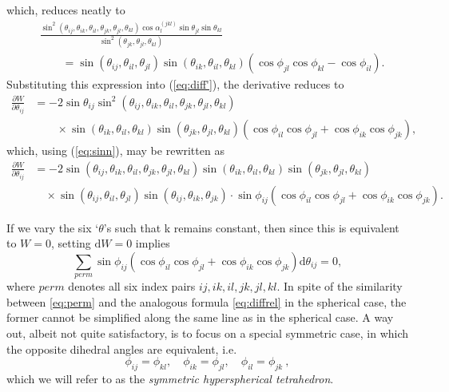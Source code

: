 \documentclass[fleqn,11pt,twoside]{article}
\theoremstyle{definition}
\begin{document}
which, reduces neatly to
\begin{align}
& \frac{\sin^2(\theta_{ij},\theta_{ik},\theta_{il},\theta_{jk},\theta_{jl},\theta_{kl})\cos\alpha_l^{(jkl)}\sin\theta_{jl}\sin\theta_{kl}}{\sin^2(\theta_{jk},\theta_{jl},\theta_{kl})} 
\nonumber \\ 
& \qquad =
\sin(\theta_{ij},\theta_{il},\theta_{jl})\sin(\theta_{ik},\theta_{il},\theta_{kl})\left(\cos\phi_{jl}\cos\phi_{kl}-
\cos\phi_{il}\right).
\end{align}
Substituting this expression into (\ref{eq:diff'}), the derivative reduces to 
\begin{align}
\frac{\partial W}{\partial\theta_{ij}}& =-2\sin\theta_{ij}\sin^2(\theta_{ij},\theta_{ik},\theta_{il},\theta_{jk},\theta_{jl},\theta_{kl}) \nonumber \\ 
& \qquad \times \sin(\theta_{ik},\theta_{il},\theta_{kl})\sin(\theta_{jk},\theta_{jl},\theta_{kl})\left(\cos\phi_{il}\cos\phi_{jl}+\cos\phi_{ik}\cos\phi_{jk}\right),
\end{align}
which, using (\ref{eq:sinn}), may be rewritten as
\begin{equation}
\begin{split}
\frac{\partial W}{\partial\theta_{ij}}& =-2\sin(\theta_{ij},\theta_{ik},\theta_{il},\theta_{jk},\theta_{jl},\theta_{kl})
\sin(\theta_{ik},\theta_{il},\theta_{kl})\sin(\theta_{jk},\theta_{jl},\theta_{kl})  \\ 
& \quad \times \sin(\theta_{ij},\theta_{il},\theta_{jl})\sin(\theta_{ij},\theta_{ik},\theta_{jk})
\cdot\sin\phi_{ij}
\left(\cos\phi_{il}\cos\phi_{jl}+\cos\phi_{ik}\cos\phi_{jk}\right).
\end{split}
\end{equation}

If we vary the six `$\theta$'s such that k remains constant, then since this is equivalent to $W=0$, setting $\mathrm{d}W=0$ implies
\begin{equation}\label{eq:perm} 
\sum_{perm}\sin\phi_{ij}\left(\cos\phi_{il}\cos\phi_{jl}+\cos\phi_{ik}\cos\phi_{jk}\right)\mathrm{d}\theta_{ij}=0, 
\end{equation}
where $perm$ denotes all six index pairs $ij,ik,il,jk,jl,kl$. In spite of the similarity between \eqref{eq:perm} and the 
analogous formula \eqref{eq:diffrel} in the spherical case, the former cannot be simplified along the same line 
as in the spherical case. A way out, albeit not quite satisfactory, is to  
focus on a special symmetric case, in which the opposite dihedral angles are equivalent, i.e. 
\[ \phi_{ij}=\phi_{kl}, \quad \phi_{ik}=\phi_{jl}, \quad \phi_{il}=\phi_{jk}\ ,  \]
which we will refer to as the \textit{symmetric hyperspherical tetrahedron}.  
\end{document}
